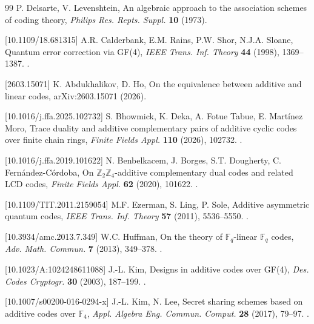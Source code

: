 \documentclass{aims}
\numberwithin{equation}{section}
\theoremstyle{definition}
\begin{document}
\begin{thebibliography}{99}
	P. Delsarte, V. Levenshtein,
	\newblock An algebraic approach to the association schemes of coding theory,
	\newblock \textit{Philips Res. Repts. Suppl.} \textbf{10} (1973).
	
	[10.1109/18.681315]
	A.R. Calderbank, E.M. Rains, P.W. Shor, N.J.A. Sloane,
	\newblock Quantum error correction via GF(4),
	\newblock \textit{IEEE Trans. Inf. Theory} \textbf{44} (1998), 1369–1387.
	\newblock {}.
	

	
	[2603.15071]
	K. Abdukhalikov, D. Ho,
	\newblock On the equivalence between additive and linear codes,
	\newblock arXiv:2603.15071 (2026).
	
	[10.1016/j.ffa.2025.102732]
	S. Bhowmick, K. Deka, A. Fotue Tabue, E. Martínez Moro,
	\newblock Trace duality and additive complementary pairs of additive cyclic codes over finite chain rings,
	\newblock \textit{Finite Fields Appl.} \textbf{110} (2026), 102732.
	\newblock {}.
	
	[10.1016/j.ffa.2019.101622]
	N. Benbelkacem, J. Borges, S.T. Dougherty, C. Fernández-Córdoba,
	\newblock On $\mathbb{Z}_2\mathbb{Z}_4$-additive complementary dual codes and related LCD codes,
	\newblock \textit{Finite Fields Appl.} \textbf{62} (2020), 101622.
	\newblock {}.
	
	[10.1109/TIT.2011.2159054]
	M.F. Ezerman, S. Ling, P. Sole,
	\newblock Additive asymmetric quantum codes,
	\newblock \textit{IEEE Trans. Inf. Theory} \textbf{57} (2011), 5536–5550.
	\newblock {}.
	
	[10.3934/amc.2013.7.349]
	W.C. Huffman,
	\newblock On the theory of $\mathbb{F}_q$-linear $\mathbb{F}_q$ codes,
	\newblock \textit{Adv. Math. Commun.} \textbf{7} (2013), 349–378.
	\newblock {}.
	
	[10.1023/A:1024248611088]
	J.-L. Kim,
	\newblock Designs in additive codes over GF(4),
	\newblock \textit{Des. Codes Cryptogr.} \textbf{30} (2003), 187–199.
	\newblock {}.
	
	[10.1007/s00200-016-0294-x]
	J.-L. Kim, N. Lee,
	\newblock Secret sharing schemes based on additive codes over $\mathbb{F}_4$,
	\newblock \textit{Appl. Algebra Eng. Commun. Comput.} \textbf{28} (2017), 79–97.
	\newblock {}.
	

\end{thebibliography}
\end{document}
